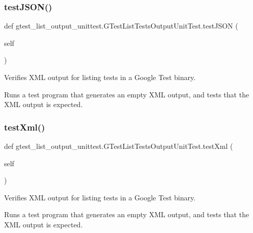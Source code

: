 \mbox{\label{classgtest__list__output__unittest_1_1_g_test_list_tests_output_unit_test_a99bc0627a969b4c7b63ed91e8f187637}} 
\subsubsection{\texorpdfstring{testJSON()}{testJSON()}}
{\footnotesize\ttfamily def gtest\+\_\+list\+\_\+output\+\_\+unittest.\+G\+Test\+List\+Tests\+Output\+Unit\+Test.\+test\+J\+S\+ON (\begin{DoxyParamCaption}\item[{}]{self }\end{DoxyParamCaption})}

\begin{DoxyVerb}Verifies XML output for listing tests in a Google Test binary.

Runs a test program that generates an empty XML output, and
tests that the XML output is expected.
\end{DoxyVerb}
 \mbox{\label{classgtest__list__output__unittest_1_1_g_test_list_tests_output_unit_test_ad3088bc8ee3a0abdabbf1b90507e272e}} 
\subsubsection{\texorpdfstring{testXml()}{testXml()}}
{\footnotesize\ttfamily def gtest\+\_\+list\+\_\+output\+\_\+unittest.\+G\+Test\+List\+Tests\+Output\+Unit\+Test.\+test\+Xml (\begin{DoxyParamCaption}\item[{}]{self }\end{DoxyParamCaption})}

\begin{DoxyVerb}Verifies XML output for listing tests in a Google Test binary.

Runs a test program that generates an empty XML output, and
tests that the XML output is expected.
\end{DoxyVerb}
 

